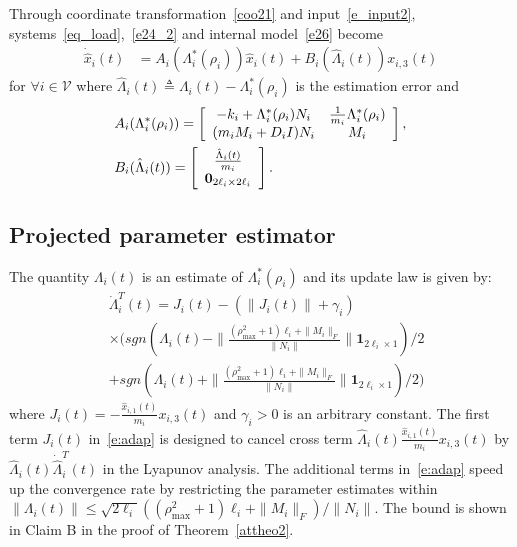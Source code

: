 \documentclass[journal]{IEEEtran}
\newcommand{\nnum}{\nonumber}
\newcommand{\VV}{{\mathcal{V}}}
\begin{document}
Through coordinate transformation~\eqref{coo21} and input~\eqref{e_input2}, systems~\eqref{eq_load},~\eqref{e24_2} and internal model~\eqref{e26} become
\begin{align}
\dot{\hat{x}}_{i}(t)&=A_i(\Lambda_i^*(\rho_i))\hat{x}_{i}(t) + B_{i}(\hat{\Lambda}_i(t))x_{i,3}(t)
\label{ate270}
\end{align}
for $\forall i \in {\VV}$ where $\hat{\Lambda}_i(t) \triangleq \Lambda_i(t)-\Lambda_i^*(\rho_i)$ is the estimation error
and
\begin{align*}
&A_i(\Lambda_i^*(\rho_i))=
\left[
\begin{array}{cc}
-k_{i}+\Lambda_i^*(\rho_i)N_i&\frac{1}{m_i} \Lambda_i^*(\rho_i)\\
(m_iM_i+D_i I) N_i&M_i\\
\end{array}
\right],\nnum\\
&B_i(\hat{\Lambda}_i(t))=
\left[
\begin{array}{c}
\frac{\hat{\Lambda}_i(t)}{m_i}\\
\bold{0}_{2\ell_i \times 2\ell_i}\\
\end{array}
\right].
\end{align*}


\subsection{Projected parameter estimator}\label{sec:adaptive2}
The quantity $\Lambda_i(t)$ is an estimate of $\Lambda_i^*(\rho_i)$ and its update law is given by:
\begin{align}
&\dot{\Lambda}_{i}^T(t)= J_{i}(t)-(\|J_{i}(t)\|+\gamma_i) \nnum\\
& \times (sgn ({\Lambda}_i(t)-\|\frac{(\rho_{\max}^2+1) \ell_i + \|M_i\|_F}{\|N_i\|}\|\textbf{1}_{2\ell_i \times 1})/2\nnum\\
&+sgn ({\Lambda}_i(t)+\|\frac{(\rho_{\max}^2+1) \ell_i + \|M_i\|_F}{\|N_i\|}\|\textbf{1}_{2\ell_i \times 1})/2)
\label{e:adap}
\end{align}
where $J_{i}(t)=-\frac{\hat{x}_{i,1}(t)}{m_i}x_{i,3}(t)$ and $\gamma_i>0$ is an arbitrary constant.
The first term $J_i(t)$ in~\eqref{e:adap} is designed to cancel cross term $\hat{\Lambda}_i(t)\frac{\hat{x}_{i,1}(t)}{m_i}x_{i,3}(t)$ by $\hat{\Lambda}_i(t)\dot{\hat{\Lambda}}_i^T(t)$ in the Lyapunov analysis.
The additional terms in~\eqref{e:adap} speed up the convergence rate by restricting the parameter estimates within $\|\Lambda_i(t)\| \leq \sqrt{2\ell_i}((\rho_{\max}^2+1) \ell_i + \|M_i\|_F)/\|N_i\|$. The bound is shown in Claim B in the proof of Theorem~\ref{attheo2}.
\end{document}
